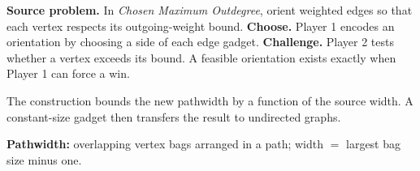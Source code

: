 
\textbf{Source problem.} In \emph{Chosen Maximum Outdegree}, orient
weighted edges so that each vertex respects its outgoing-weight bound.
\PosterPara
\textbf{Choose.} Player 1 encodes an orientation by choosing a side of
each edge gadget.
\PosterPara
\textbf{Challenge.} Player 2 tests whether a vertex exceeds its bound.
A feasible orientation exists exactly when Player 1 can force a win.



The construction bounds the new pathwidth by a function of the source
width. A constant-size gadget then transfers the result to undirected graphs.
\PosterPara
{\PosterSmallFont\color{PosterMuted}
  \textbf{Pathwidth:} overlapping vertex bags arranged in a path;
  width $=$ largest bag size minus one.
  \par}
